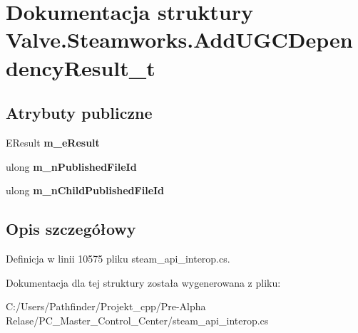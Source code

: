 \hypertarget{struct_valve_1_1_steamworks_1_1_add_u_g_c_dependency_result__t}{}\section{Dokumentacja struktury Valve.\+Steamworks.\+Add\+U\+G\+C\+Dependency\+Result\+\_\+t}
\label{struct_valve_1_1_steamworks_1_1_add_u_g_c_dependency_result__t}
\subsection*{Atrybuty publiczne}
\begin{DoxyCompactItemize}
\item 
\mbox{\label{struct_valve_1_1_steamworks_1_1_add_u_g_c_dependency_result__t_a1a5b0f4bb4feb301a0c58dc0a990b921}} 
E\+Result {\bfseries m\+\_\+e\+Result}
\item 
\mbox{\label{struct_valve_1_1_steamworks_1_1_add_u_g_c_dependency_result__t_a9636683c767e9fed5ab4d9a2f5ccbcbb}} 
ulong {\bfseries m\+\_\+n\+Published\+File\+Id}
\item 
\mbox{\label{struct_valve_1_1_steamworks_1_1_add_u_g_c_dependency_result__t_a43ffde9c923aea4ade801a1afb141ea1}} 
ulong {\bfseries m\+\_\+n\+Child\+Published\+File\+Id}
\end{DoxyCompactItemize}


\subsection{Opis szczegółowy}


Definicja w linii 10575 pliku steam\+\_\+api\+\_\+interop.\+cs.



Dokumentacja dla tej struktury została wygenerowana z pliku\+:\begin{DoxyCompactItemize}
\item 
C\+:/\+Users/\+Pathfinder/\+Projekt\+\_\+cpp/\+Pre-\/\+Alpha Relase/\+P\+C\+\_\+\+Master\+\_\+\+Control\+\_\+\+Center/steam\+\_\+api\+\_\+interop.\+cs\end{DoxyCompactItemize}
